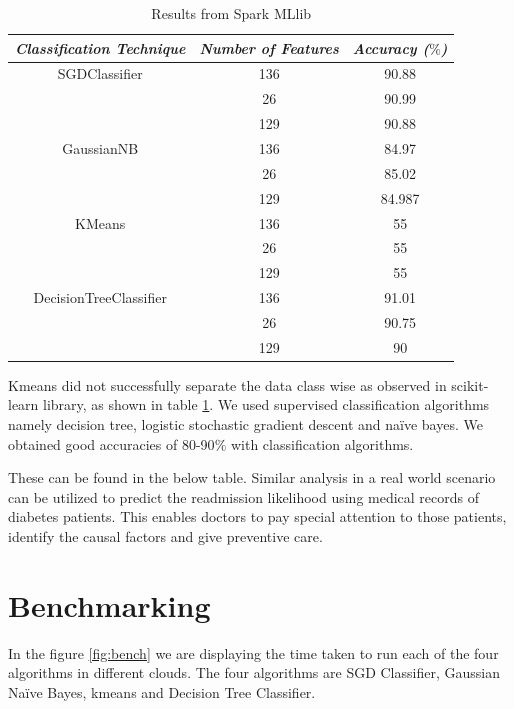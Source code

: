 \documentclass[9pt,twocolumn,twoside]{../../styles/osajnl}
\begin{document}
\begin{table}[h!]
\centering
 \begin{tabular}{|c c c|} 
 \hline
 \textit{Classification Technique} & \textit{Number of Features} & \textit{Accuracy ($\%$)}\\ 
 \hline
 \hline 
  SGDClassifier & 136 & 90.88
 \\  & 26 & 90.99\\
  & 129 & 90.88\\
 \hline 
  GaussianNB & 136 & 84.97
 \\  & 26 & 85.02\\
  & 129 & 84.987
\\ 
 \hline 
   KMeans & 136 & 55
 \\ 
   & 26 & 55\\
  & 129 & 55\\ 
 \hline 
DecisionTreeClassifier & 136 & 91.01 \\ & 26 & 90.75\\
  & 129 & 90\\
\hline 
\end{tabular}
\caption{Results from Spark MLlib}
\label{table:mllib}
\end{table}

Kmeans did not successfully separate the data class wise as observed in scikit-learn library, as shown in table \ref{table:mllib}.  We used  supervised classification algorithms namely decision tree, logistic stochastic gradient descent and naïve bayes. We obtained good accuracies of 80-90$\%$ with classification algorithms.

These can be found in the below table.
Similar analysis in a real world scenario can be utilized to predict the readmission likelihood using medical records of diabetes patients. This enables doctors to  pay special attention to those patients, identify the causal factors and give preventive care.



\section{Benchmarking}

In the figure \ref{fig:bench} we are displaying the time taken to run each of the four algorithms in different clouds. The four algorithms are SGD Classifier, Gaussian Naïve Bayes, kmeans and Decision Tree Classifier.
\end{document}
